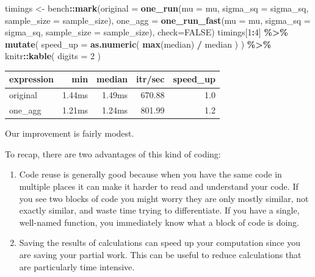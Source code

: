 \documentclass[
]{book}
\newenvironment{Shaded}{\begin{snugshade}}{\end{snugshade}}
\newcommand{\AttributeTok}[1]{\textcolor[rgb]{0.13,0.29,0.53}{#1}}
\newcommand{\ConstantTok}[1]{\textcolor[rgb]{0.56,0.35,0.01}{#1}}
\newcommand{\DecValTok}[1]{\textcolor[rgb]{0.00,0.00,0.81}{#1}}
\newcommand{\FunctionTok}[1]{\textcolor[rgb]{0.13,0.29,0.53}{\textbf{#1}}}
\newcommand{\NormalTok}[1]{#1}
\newcommand{\OtherTok}[1]{\textcolor[rgb]{0.56,0.35,0.01}{#1}}
\newcommand{\SpecialCharTok}[1]{\textcolor[rgb]{0.81,0.36,0.00}{\textbf{#1}}}
\begin{document}
\begin{Shaded}
\begin{Highlighting}[]
\NormalTok{timings }\OtherTok{\textless{}{-}}\NormalTok{ bench}\SpecialCharTok{::}\FunctionTok{mark}\NormalTok{(}\AttributeTok{original =} \FunctionTok{one\_run}\NormalTok{(}\AttributeTok{mu =}\NormalTok{ mu, }\AttributeTok{sigma\_sq =}\NormalTok{ sigma\_sq, }
                                          \AttributeTok{sample\_size =}\NormalTok{ sample\_size),}
                       \AttributeTok{one\_agg =} \FunctionTok{one\_run\_fast}\NormalTok{(}\AttributeTok{mu =}\NormalTok{ mu, }\AttributeTok{sigma\_sq =}\NormalTok{ sigma\_sq, }
                                              \AttributeTok{sample\_size =}\NormalTok{ sample\_size),}
                       \AttributeTok{check=}\ConstantTok{FALSE}\NormalTok{)}
\NormalTok{timings[}\DecValTok{1}\SpecialCharTok{:}\DecValTok{4}\NormalTok{] }\SpecialCharTok{\%\textgreater{}\%}
  \FunctionTok{mutate}\NormalTok{( }\AttributeTok{speed\_up =} \FunctionTok{as.numeric}\NormalTok{( }\FunctionTok{max}\NormalTok{(median) }\SpecialCharTok{/}\NormalTok{ median ) ) }\SpecialCharTok{\%\textgreater{}\%}
\NormalTok{  knitr}\SpecialCharTok{::}\FunctionTok{kable}\NormalTok{( }\AttributeTok{digits =} \DecValTok{2}\NormalTok{ )}
\end{Highlighting}
\end{Shaded}

\begin{tabular}{l|r|r|r|r}
\hline
expression & min & median & itr/sec & speed\_up\\
\hline
original & 1.44ms & 1.49ms & 670.88 & 1.0\\
\hline
one\_agg & 1.21ms & 1.24ms & 801.99 & 1.2\\
\hline
\end{tabular}

Our improvement is fairly modest.

To recap, there are two advantages of this kind of coding:

\begin{enumerate}
\def\labelenumi{\arabic{enumi}.}
\item
  Code reuse is generally good because when you have the same code in multiple places it can make it harder to read and understand your code. If you see two blocks of code you might worry they are only mostly similar, not exactly similar, and waste time trying to differentiate. If you have a single, well-named function, you immediately know what a block of code is doing.
\item
  Saving the results of calculations can speed up your computation since you are saving your partial work. This can be useful to reduce calculations that are particularly time intensive.
\end{enumerate}
\end{document}
